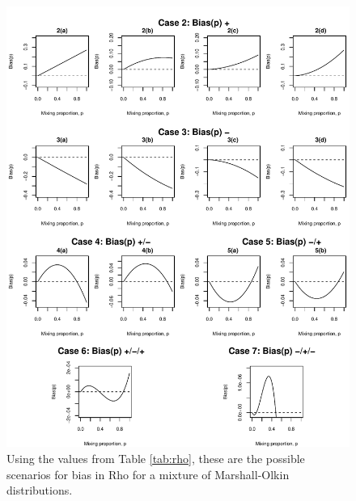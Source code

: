 \begin{figure}
    \centering
    \includegraphics[scale=0.8]{images/rho_MO_graphs.pdf}
    \caption{Using the values from Table \ref{tab:rho}, these are the possible scenarios for bias in Rho for a mixture of Marshall-Olkin distributions.}
    \label{fig:rhoCases}
\end{figure}